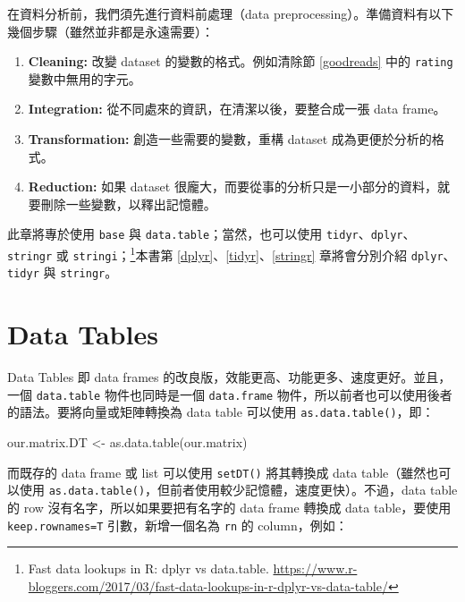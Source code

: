 \documentclass[
]{book}
\newenvironment{Shaded}{\begin{snugshade}}{\end{snugshade}}
\newcommand{\FunctionTok}[1]{\textcolor[rgb]{0.00,0.00,0.00}{#1}}
\newcommand{\NormalTok}[1]{#1}
\newcommand{\OtherTok}[1]{\textcolor[rgb]{0.56,0.35,0.01}{#1}}
\let\oldfootnote\footnote
\renewcommand\footnote[1]{\oldfootnote{%
\renewcommand\baselinestretch{1.1}%
\large\footnotesize\ignorespaces#1}}
\theoremstyle{definition}
\theoremstyle{remark}
\begin{document}
在資料分析前，我們須先進行資料前處理（data preprocessing）。準備資料有以下幾個步驟（雖然並非都是永遠需要）：

\begin{enumerate}
\def\labelenumi{\arabic{enumi}.}
\item
  \textbf{Cleaning:} 改變 dataset 的變數的格式。例如清除節 \ref{goodreads} 中的 \texttt{rating} 變數中無用的字元。
\item
  \textbf{Integration:} 從不同處來的資訊，在清潔以後，要整合成一張 data frame。
\item
  \textbf{Transformation:} 創造一些需要的變數，重構 dataset 成為更便於分析的格式。
\item
  \textbf{Reduction:} 如果 dataset 很龐大，而要從事的分析只是一小部分的資料，就要刪除一些變數，以釋出記憶體。
\end{enumerate}

此章將專於使用 \texttt{base} 與 \texttt{data.table}；當然，也可以使用 \texttt{tidyr}、\texttt{dplyr}、\texttt{stringr} 或 \texttt{stringi}；\footnote{Fast data lookups in R: dplyr vs data.table. \url{https://www.r-bloggers.com/2017/03/fast-data-lookups-in-r-dplyr-vs-data-table/}}本書第 \ref{dplyr}、\ref{tidyr}、\ref{stringr} 章將會分別介紹 \texttt{dplyr}、\texttt{tidyr} 與 \texttt{stringr}。

\hypertarget{datatable}{%
\section{Data Tables}\label{datatable}}

Data Tables 即 data frames 的改良版，效能更高、功能更多、速度更好。並且，一個 \texttt{data.table} 物件也同時是一個 \texttt{data.frame} 物件，所以前者也可以使用後者的語法。要將向量或矩陣轉換為 data table 可以使用 \texttt{as.data.table()}，即：

\begin{Shaded}
\begin{Highlighting}[]
\NormalTok{our.matrix.DT }\OtherTok{\textless{}{-}} \FunctionTok{as.data.table}\NormalTok{(our.matrix)}
\end{Highlighting}
\end{Shaded}

而既存的 data frame 或 list 可以使用 \texttt{setDT()} 將其轉換成 data table（雖然也可以使用 \texttt{as.data.table()}，但前者使用較少記憶體，速度更快）。不過，data table 的 row 沒有名字，所以如果要把有名字的 data frame 轉換成 data table，要使用 \texttt{keep.rownames=T} 引數，新增一個名為 \texttt{rn} 的 column，例如：
\end{document}
